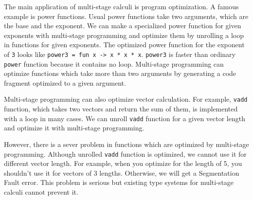 
The main application of multi-stage calculi is program optimization. 
A famous example is power functions.
Usual power functions take two arguments, which are the base and the exponent.
We can make a specialized power function for given exponents with multi-stage programming and 
optimize them by unrolling a loop in functions for given exponents.
The optimized power function for the exponent of \verb|3| looks like \verb|power3 = fun x -> x * x * x|.
\verb|power3| is faster than ordinary \verb|power| function because it contains no loop.
Multi-stage programming can optimize functions which take more than two arguments 
by generating a code fragment optimized to a given argument.


Multi-stage programming can also optimize vector calculation.
For example, \verb|vadd| function, which takes two vectors and return the sum of them,
is implemented with a loop in many cases.
We can unroll \verb|vadd| function for a given vector length and optimize it with multi-stage programming.


However, there is a sever problem in functions which are optimized by multi-stage programming.
Although unrolled \verb|vadd| function is optimized, we cannot use it for different vector length.
For example, when you optimize for the length of 5, you shouldn't use it for vectors of 3 lengths.
Otherwise, we will get a Segmentation Fault error.
This problem is serious but existing type systems for multi-stage calculi cannot prevent it.


